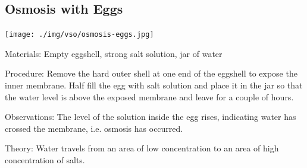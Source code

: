 \begin{multicols}{2}
\subsection{Osmosis with Eggs} %

\begin{center}
\texttt{[image: ./img/vso/osmosis-eggs.jpg]}
\end{center}

\begin{description*}
\item[Materials:]{Empty eggshell, strong salt solution, jar of water}
\item[Procedure:]{Remove the hard outer shell at
one end of the eggshell to
expose the inner membrane. Half
fill the egg with salt solution and
place it in the jar so that the
water level is above the exposed
membrane and leave for a couple
of hours. }
\item[Observations:]{The level of
the solution inside the egg rises,
indicating water has crossed the
membrane, i.e. osmosis has
occurred.}
\item[Theory:]{Water travels from an area of low concentration to an area of high concentration of salts.}
\end{description*}


\end{multicols}

\pagebreak